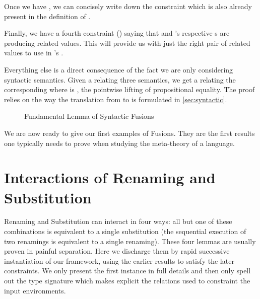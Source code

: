 Once we have , we can concisely write down the constraint  which
is also already present in the definition of .


Finally, we have a fourth constraint () saying that  and
's respective s are producing related values. This will provide
us with just the right pair of related values to use in 's .


Everything else is a direct consequence of the fact we are only considering
syntactic semantics. Given a  relating three 
semantics, we get a  relating the corresponding  where
 is , the pointwise lifting of propositional equality. The proof
relies on the way the translation from  to  is formulated
in \cref{sec:syntactic}.

\begin{figure}
\caption{Fundamental Lemma of Syntactic Fusions\label{fig:fundamentalsynfus}}
\end{figure}

We are now ready to give our first examples of Fusions. They are the first results one
typically needs to prove when studying the meta-theory of a language.

\section{Interactions of Renaming and Substitution}

Renaming and Substitution can interact in four ways: all but one of these
combinations is equivalent to a single substitution (the sequential execution
of two renamings is equivalent to a single renaming). These four lemmas are
usually proven in painful separation. Here we discharge them by rapid successive
instantiation of our framework, using the earlier results to satisfy the later
constraints. We only present the first instance in full details and then only
spell out the  type signature which makes explicit the relations
used to constraint the input environments.

